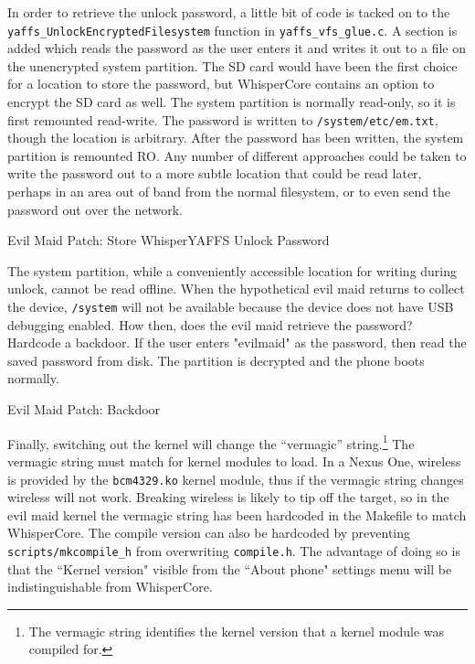 In order to retrieve the unlock password, a little bit of code is tacked on to the \texttt{yaffs\_UnlockEncryptedFilesystem}
function in \texttt{yaffs\_vfs\_glue.c}. A section is added which reads the password as the user enters it and writes it
out to a file on the unencrypted system partition.  The SD card would have been the first choice for a location to store the
password, but WhisperCore contains an option to encrypt the SD card as well. The system partition is normally read-only, so it is
first remounted read-write. The password is written to \texttt{/system/etc/em.txt}, though the location is arbitrary. After the password has
been written, the system partition is remounted RO. Any number of different approaches could be taken to write the password out to a
more subtle location that could be read later, perhaps in an area out of band from the normal filesystem, or to even send the
password out over the network. 

\begin{table}[htpb]

\label{tab:storepass}
\caption{Evil Maid Patch: Store WhisperYAFFS Unlock Password}
\end{table}

The system partition, while a conveniently accessible location for writing during unlock, cannot be read offline.  When the
hypothetical evil maid returns to collect the device, \texttt{/system} will not be available because the device does not have USB
debugging enabled.  How then, does the evil maid retrieve the password? Hardcode a backdoor.  If the user enters "evilmaid" as the
password, then read the saved password from disk.  The partition is decrypted and the phone boots normally. 

\begin{table}[htpb]

\label{tab:backdoor}
\caption{Evil Maid Patch: Backdoor}
\end{table}

Finally, switching out the kernel will change the ``vermagic'' string.\footnote{The vermagic string identifies the kernel version
that a kernel module was compiled for.} The vermagic string must match for kernel modules to load.  In a Nexus One, wireless is
provided by the \texttt{bcm4329.ko} kernel module, thus if the vermagic string changes wireless will not work.  Breaking wireless is likely
to tip off the target, so in the evil maid kernel the vermagic string has been hardcoded in the Makefile to match WhisperCore. 
The compile version can also be hardcoded by preventing \texttt{scripts/mkcompile\_h} from overwriting \texttt{compile.h}. 
The advantage of doing so is that the ``Kernel version" visible from the ``About phone" settings menu will be indistinguishable from WhisperCore.

